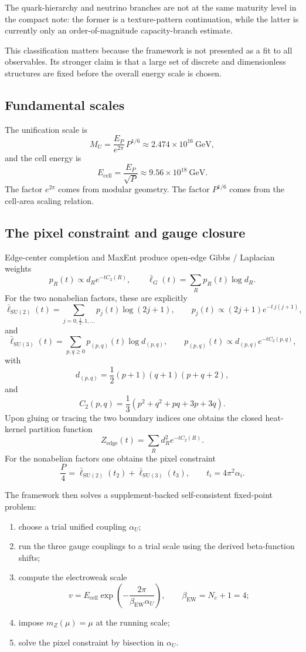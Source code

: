 \documentclass[11pt]{article}
\newcommand{\SU}{\mathrm{SU}}
\begin{document}
The quark-hierarchy and neutrino branches are not at the same maturity level in the compact note: the former is a texture-pattern continuation, while the latter is currently only an order-of-magnitude capacity-branch estimate.

This classification matters because the framework is not presented as a fit to all observables. Its stronger claim is that a large set of discrete and dimensionless structures are fixed before the overall energy scale is chosen.

\subsection{Fundamental scales}

The unification scale is
\[
M_U=\frac{E_P}{e^{2\pi}}\,P^{1/6}\approx 2.474\times 10^{16}\ \mathrm{GeV},
\]
and the cell energy is
\[
E_{\mathrm{cell}}=\frac{E_P}{\sqrt P}\approx 9.56\times 10^{18}\ \mathrm{GeV}.
\]
The factor $e^{2\pi}$ comes from modular geometry. The factor $P^{1/6}$ comes from the cell-area scaling relation.

\subsection{The pixel constraint and gauge closure}

Edge-center completion and MaxEnt produce open-edge Gibbs / Laplacian weights
\[
p_R(t)\propto d_R e^{-tC_2(R)},
\qquad
\bar\ell_G(t)=\sum_R p_R(t)\log d_R.
\]
For the two nonabelian factors, these are explicitly
\[
\bar\ell_{\SU(2)}(t)=\sum_{j=0,\frac12,1,\dots} p_j(t)\log(2j+1),
\qquad
p_j(t)\propto (2j+1)e^{-t\,j(j+1)},
\]
and
\[
\bar\ell_{\SU(3)}(t)=\sum_{p,q\ge 0} p_{(p,q)}(t)\log d_{(p,q)},
\qquad
p_{(p,q)}(t)\propto d_{(p,q)}e^{-tC_2(p,q)},
\]
with
\[
d_{(p,q)}=\frac12(p+1)(q+1)(p+q+2),
\]
and
\[
C_2(p,q)=\frac13(p^2+q^2+pq+3p+3q).
\]
Upon gluing or tracing the two boundary indices one obtains the closed heat-kernel partition function
\[
Z_{\mathrm{edge}}(t)=\sum_R d_R^2 e^{-tC_2(R)}.
\]
For the nonabelian factors one obtains the pixel constraint
\[
\frac{P}{4}=\bar\ell_{\SU(2)}(t_2)+\bar\ell_{\SU(3)}(t_3),
\qquad
t_i=4\pi^2\alpha_i.
\]

The framework then solves a supplement-backed self-consistent fixed-point problem:
\begin{enumerate}[leftmargin=2em]
\item choose a trial unified coupling $\alpha_U$;
\item run the three gauge couplings to a trial scale using the derived beta-function shifts;
\item compute the electroweak scale
\[
v=E_{\mathrm{cell}}\exp\!\left(-\frac{2\pi}{\beta_{\mathrm{EW}}\alpha_U}\right),
\qquad
\beta_{\mathrm{EW}}=N_c+1=4;
\]
\item impose $m_Z(\mu)=\mu$ at the running scale;
\item solve the pixel constraint by bisection in $\alpha_U$.
\end{enumerate}
\end{document}
